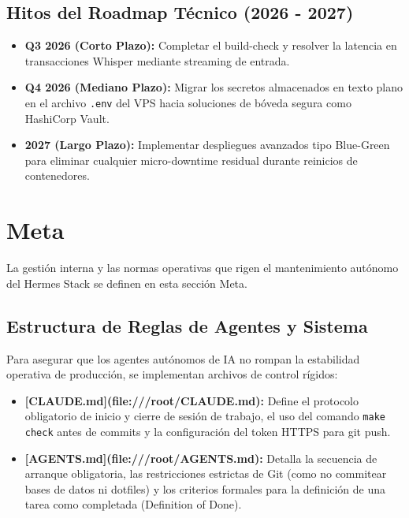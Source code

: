 \documentclass[12pt,a4paper,openany]{book}
\newcommand{\code}[1]{\texttt{\small#1}}
\begin{document}
\section{Hitos del Roadmap Técnico (2026 - 2027)}
\begin{itemize}
    \item \textbf{Q3 2026 (Corto Plazo):} Completar el build-check y resolver la latencia en transacciones Whisper mediante streaming de entrada.
    \item \textbf{Q4 2026 (Mediano Plazo):} Migrar los secretos almacenados en texto plano en el archivo \code{.env} del VPS hacia soluciones de bóveda segura como HashiCorp Vault.
    \item \textbf{2027 (Largo Plazo):} Implementar despliegues avanzados tipo Blue-Green para eliminar cualquier micro-downtime residual durante reinicios de contenedores.
\end{itemize}

\chapter{Meta}
La gestión interna y las normas operativas que rigen el mantenimiento autónomo del Hermes Stack se definen en esta sección Meta.

\section{Estructura de Reglas de Agentes y Sistema}
Para asegurar que los agentes autónomos de IA no rompan la estabilidad operativa de producción, se implementan archivos de control rígidos:
\begin{itemize}
    \item \textbf{[CLAUDE.md](file:///root/CLAUDE.md):} Define el protocolo obligatorio de inicio y cierre de sesión de trabajo, el uso del comando \code{make check} antes de commits y la configuración del token HTTPS para git push.
    \item \textbf{[AGENTS.md](file:///root/AGENTS.md):} Detalla la secuencia de arranque obligatoria, las restricciones estrictas de Git (como no commitear bases de datos ni dotfiles) y los criterios formales para la definición de una tarea como completada (Definition of Done).
\end{itemize}
\end{document}
